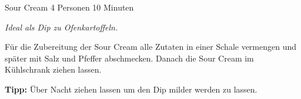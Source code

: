 \documentclass[
  DIV=11,%
  pagesize,%
  fontsize=11pt,%
  paper=a4,%
]{scrartcl}
\begin{document}
\begin{recipe}{Sour Cream} {4 Personen} {10 Minuten}

\freeform
\textit{Ideal als Dip zu Ofenkartoffeln.}


Für die Zubereitung der Sour Cream alle Zutaten in einer Schale vermengen und später mit Salz und Pfeffer abschmecken.
Danach die Sour Cream im Kühlschrank ziehen lassen.

\freeform
\hrulefill

\freeform 
\textbf{Tipp:}
Über Nacht ziehen lassen um den Dip milder werden zu lassen.

\end{recipe}
\end{document}
